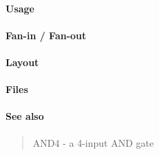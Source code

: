 \paragraph{Usage}

\paragraph{Fan-in / Fan-out}

\paragraph{Layout}

\paragraph{Files}

\paragraph{See also}
\begin{quote}
    AND4 - a 4-input AND gate
\end{quote}


